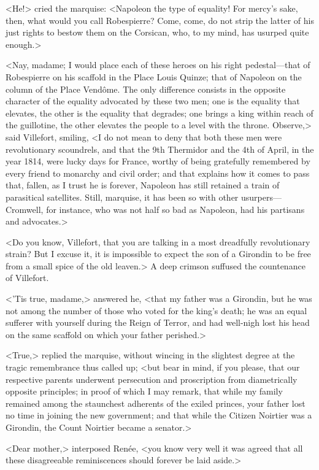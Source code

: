  <He!> cried the marquise: <Napoleon the type of equality! For mercy's sake, then, what would you call Robespierre? Come, come, do not strip the latter of his just rights to bestow them on the Corsican, who, to my mind, has usurped quite enough.>  
 
 <Nay, madame; I would place each of these heroes on his right pedestal—that of Robespierre on his scaffold in the Place Louis Quinze; that of Napoleon on the column of the Place Vendôme. The only difference consists in the opposite character of the equality advocated by these two men; one is the equality that elevates, the other is the equality that degrades; one brings a king within reach of the guillotine, the other elevates the people to a level with the throne. Observe,> said Villefort, smiling, <I do not mean to deny that both these men were revolutionary scoundrels, and that the 9th Thermidor and the 4th of April, in the year 1814, were lucky days for France, worthy of being gratefully remembered by every friend to monarchy and civil order; and that explains how it comes to pass that, fallen, as I trust he is forever, Napoleon has still retained a train of parasitical satellites. Still, marquise, it has been so with other usurpers—Cromwell, for instance, who was not half so bad as Napoleon, had his partisans and advocates.> 

 <Do you know, Villefort, that you are talking in a most dreadfully revolutionary strain? But I excuse it, it is impossible to expect the son of a Girondin to be free from a small spice of the old leaven.> A deep crimson suffused the countenance of Villefort. 

 <'Tis true, madame,> answered he, <that my father was a Girondin, but he was not among the number of those who voted for the king's death; he was an equal sufferer with yourself during the Reign of Terror, and had well-nigh lost his head on the same scaffold on which your father perished.> 

 <True,> replied the marquise, without wincing in the slightest degree at the tragic remembrance thus called up; <but bear in mind, if you please, that our respective parents underwent persecution and proscription from diametrically opposite principles; in proof of which I may remark, that while my family remained among the staunchest adherents of the exiled princes, your father lost no time in joining the new government; and that while the Citizen Noirtier was a Girondin, the Count Noirtier became a senator.> 

 <Dear mother,> interposed Renée, <you know very well it was agreed that all these disagreeable reminiscences should forever be laid aside.> 

